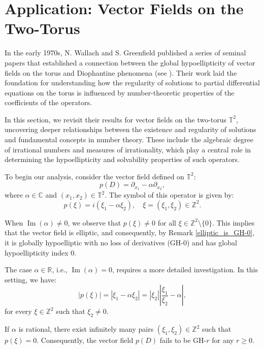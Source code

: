 \documentclass[11pt]{amsart}
\numberwithin{equation}{section}
\theoremstyle{definition}
\begin{document}
\section{Application: Vector Fields on the Two-Torus}
	
	In the early 1970s, N. Wallach and S. Greenfield published a series of seminal papers that established a connection between the global hypoellipticity of vector fields on the torus and Diophantine phenomena (see \cite{GW1972_pams, GW1973_tams, GW1973_top}). Their work laid the foundation for understanding how the regularity of solutions to partial differential equations on the torus is influenced by number-theoretic properties of the coefficients of the operators. 
	
	In this section, we revisit their results for vector fields on the two-torus \( \mathbb{T}^2 \), uncovering deeper relationships between the existence and regularity of solutions and fundamental concepts in number theory. These include the algebraic degree of irrational numbers and measures of irrationality, which play a central role in determining the hypoellipticity and solvability properties of such operators.
	
	To begin our analysis, consider the vector field defined on \( \mathbb{T}^2 \):
	\[
	p(D) = \partial_{x_1} - \alpha \partial_{x_2},
	\]
	where \( \alpha \in \mathbb{C} \) and \( (x_1, x_2) \in \mathbb{T}^2 \). The symbol of this operator is given by:
	\[
	p(\xi) = i(\xi_1 - \alpha \xi_2), \quad \xi = (\xi_1, \xi_2) \in \mathbb{Z}^2.
	\]
	
	When \( \operatorname{Im}(\alpha) \neq 0 \), we observe that \( p(\xi) \neq 0 \) for all \( \xi \in \mathbb{Z}^2 \setminus \{0\} \). This implies that the vector field is elliptic, and consequently, by Remark \ref{elliptic_is_GH-0}, it is globally hypoelliptic with no loss of derivatives (GH-\( 0 \)) and has global hypoellipticity index \( 0 \).
	
	The case \( \alpha \in \mathbb{R} \), i.e., \( \operatorname{Im}(\alpha) = 0 \), requires a more detailed investigation. In this setting, we have:
	\[
	|p(\xi)| = |\xi_1 - \alpha \xi_2| = |\xi_2| \left| \frac{\xi_1}{\xi_2} - \alpha \right|,
	\]
	for every \( \xi \in \mathbb{Z}^2 \) such that \( \xi_2 \neq 0 \).
	
	If  \( \alpha \) is rational, there exist infinitely many pairs \( (\xi_1, \xi_2) \in \mathbb{Z}^2 \) such that \( p(\xi) = 0 \). Consequently, the vector field \( p(D) \) fails to be GH-\( r \) for any \( r \geq 0 \).
	
\end{document}
